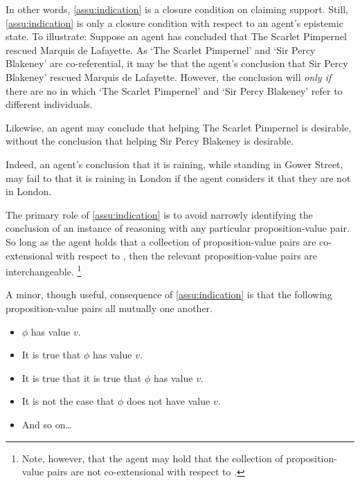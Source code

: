\begin{note}
  In other words, \autoref{assu:indication} is a closure condition on claiming support.
  Still, \autoref{assu:indication} is only a closure condition with respect to an agent's epistemic state.
  To illustrate:
  Suppose an agent has concluded that The Scarlet Pimpernel rescued Marquis de Lafayette.
  As `The Scarlet Pimpernel' and `Sir Percy Blakeney' are co-referential, it may be that the agent's conclusion  that Sir Percy Blakeney' rescued Marquis de Lafayette.
  However, the conclusion will  \emph{only if} there are no  in which `The Scarlet Pimpernel' and `Sir Percy Blakeney' refer to different individuals.

  Likewise, an agent may conclude that helping The Scarlet Pimpernel is desirable, without the conclusion \indicatePr{} that helping Sir Percy Blakeney is desirable.

  Indeed, an agent's conclusion that it is raining, while standing in Gower Street, may fail to \indicateN{} that it is raining in London if the agent considers it \epPAd{} that they are not in London.
\end{note}

\begin{note}
  The primary role of \autoref{assu:indication} is to avoid narrowly identifying the conclusion of an instance of reasoning with any particular proposition-value pair.
  So long as the agent holds that a collection of proposition-value pairs are co-extensional with respect to , then the relevant proposition-value pairs are interchangeable.\nolinebreak
  \footnote{
    Note, however, that the agent may hold that the collection of proposition-value pairs are not co-extensional with respect to .
  }
\end{note}

\begin{note}
  A minor, though useful, consequence of \autoref{assu:indication} is that the following proposition-value pairs all mutually \indicateN{} one another.
  \begin{itemize}
  \item \(\phi\) has value \(v\).
  \item It is true that \(\phi\) has value \(v\).
  \item It is true that it is true that \(\phi\) has value \(v\).
  \item It is not the case that \(\phi\) does not have value \(v\).
  \item And so on\dots
  \end{itemize}
\end{note}

